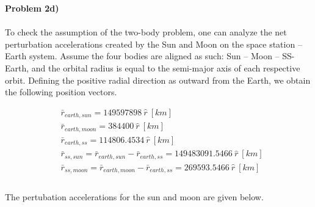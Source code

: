 \documentclass[a4paper]{article}
\begin{document}
\noindent \textbf{Problem 2d)} \\
\\
To check the assumption of the two-body problem, one can analyze the net perturbation accelerations created by the Sun and Moon on the space station – Earth system. Assume the four bodies are aligned as such: Sun – Moon – SS-Earth, and the orbital radius is equal to the semi-major axis of each respective orbit. Defining the positive radial direction as outward from the Earth, we obtain the following position vectors. 

\begin{equation}
	\begin{aligned}
		& \bar{r}_{earth,sun} = 149597898 \ \hat{r} \ [km] \\
		& \bar{r}_{earth,moon}  = 384400 \ \hat{r} \ [km] \\
		& \bar{r}_{earth,ss}   = 114806.4534 \ \hat{r} \ [km] \\
		& \bar{r}_{ss,sun}  = \bar{r}_{earth,sun} - \bar{r}_{earth,ss} = 149483091.5466  \ \hat{r} \ [km] \\
		& \bar{r}_{ss,moon}  = \bar{r}_{earth,moon} - \bar{r}_{earth,ss} = 269593.5466\ \hat{r} \ [km] \\
	\end{aligned}
\end{equation} 
\\
The pertubation accelerations for the sun and moon are given below.
\end{document}
